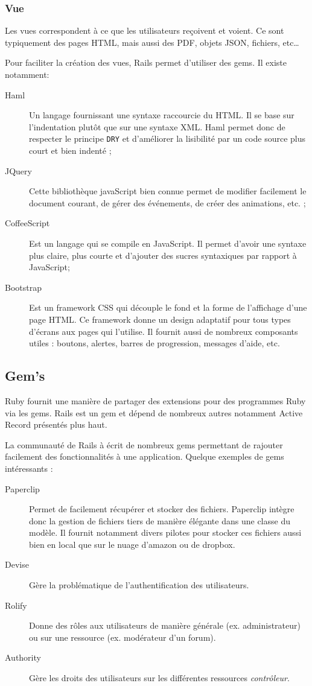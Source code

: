 \subsubsection{Vue} 
Les vues correspondent à ce que les utilisateurs reçoivent et voient. Ce sont typiquement des pages HTML, mais aussi des PDF, objets JSON, fichiers, etc\ldots

Pour faciliter la création des vues, Rails permet d'utiliser des gems. Il existe notamment: 
\begin{description}
  \item[Haml] Un langage fournissant une syntaxe raccourcie du HTML. Il se base sur l'indentation plutôt que sur une syntaxe XML. Haml permet donc de respecter le principe \texttt{DRY} et d'améliorer la lisibilité par un code source plus court et bien indenté ; \label{haml}
  \item[JQuery] Cette bibliothèque javaScript bien connue permet de modifier facilement le document courant, de gérer des événements, de créer des animations, etc. ;
  \item[CoffeeScript] Est un langage qui se compile en JavaScript. Il permet d'avoir une syntaxe plus claire, plus courte et d'ajouter des sucres syntaxiques par rapport à JavaScript;
  \item[Bootstrap] Est un framework CSS qui découple le fond et la forme de l'affichage d'une page HTML. Ce framework donne un design adaptatif pour tous types d'écrans aux pages qui l'utilise. Il fournit aussi de nombreux composants utiles : boutons, alertes, barres de progression, messages d'aide, etc. \label{bootstrap}
\end{description}
\subsection{Gem's}
Ruby fournit une manière de partager des extensions pour des programmes Ruby via les gems. Rails est un gem et dépend de nombreux autres notamment Active Record présentés plus haut.

La communauté de Rails à écrit de nombreux gems permettant de rajouter facilement des fonctionnalités à une application. Quelque exemples de gems intéressants :
\begin{description}
  \item[Paperclip] Permet de facilement récupérer et stocker des fichiers. Paperclip intègre donc la gestion de fichiers tiers de manière élégante dans une classe du modèle. Il fournit notamment divers pilotes pour stocker ces fichiers aussi bien en local que sur le nuage d'amazon ou de dropbox.
  \item[Devise] Gère la problématique de l'authentification des utilisateurs.
  \item[Rolify] Donne des rôles aux utilisateurs de manière générale (ex. administrateur) ou sur une ressource (ex. modérateur d'un forum).\label{rolify}
  \item[Authority] Gère les droits des utilisateurs sur les différentes ressources \textit{contrôleur}. \label{authority}
\end{description}

